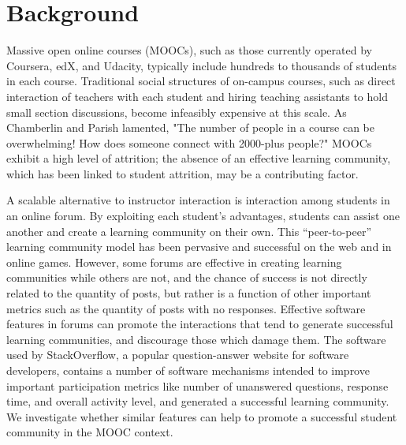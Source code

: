 \documentclass{sigchi}
\begin{document}

\section{Background}

Massive open online courses (MOOCs), such as those currently operated by Coursera, edX, and Udacity, typically include hundreds to thousands of students in each course. Traditional social structures of on-campus courses, such as direct interaction of teachers with each student and hiring teaching assistants to hold small section discussions, become infeasibly expensive at this scale. As Chamberlin and Parish lamented, "The number of people in a course can be overwhelming! How does someone connect with 2000-plus people?"  \cite{Chamberlin:2011:MMO:2016016.2016017} MOOCs exhibit a high level of attrition; \cite{oro36657} the absence of an effective learning community, which has been linked to student attrition, \cite{tinto1993leaving} may be a contributing factor.

A scalable alternative to instructor interaction is interaction among students in an online forum. By exploiting each student's advantages, students can assist one another and create a learning community on their own. This ``peer-to-peer'' learning community model has been pervasive and successful on the web and in online games. \cite{thomas2011new} However, some forums are effective in creating learning communities while others are not, and the chance of success is not directly related to the quantity of posts, but rather is a function of other important metrics such as the quantity of posts with no responses. \cite{quteprints12341} Effective software features in forums can promote the interactions that tend to generate successful learning communities, and discourage those which damage them. The software used by StackOverflow, a popular question-answer website for software developers, contains a number of software mechanisms intended to improve important participation metrics like number of unanswered questions, response time, and overall activity level, and generated a successful learning community. We investigate whether similar features can help to promote a successful student community in the MOOC context.

\end{document}
